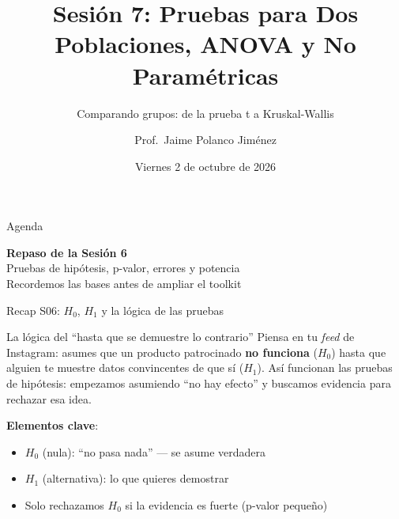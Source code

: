 \documentclass[aspectratio=169, 11pt]{beamer}
\title{Sesión 7: Pruebas para Dos Poblaciones, ANOVA y No Paramétricas}
\subtitle{Comparando grupos: de la prueba t a Kruskal-Wallis}
\author{Prof.\ Jaime Polanco Jim\'enez}
\date{Viernes 2 de octubre de 2026}
\begin{document}
\begin{frame}
\titlepage
\end{frame}

\begin{frame}{Agenda}
\tableofcontents
\end{frame}

\begin{frame}{}
\vfill
\centering
{\Large\textbf{Repaso de la Sesi\'on 6}}\\[1em]
{\normalsize Pruebas de hip\'otesis, p-valor, errores y potencia}\\[0.5em]
{\small Recordemos las bases antes de ampliar el toolkit}
\vfill
\end{frame}

\begin{frame}{Recap S06: $H_0$, $H_1$ y la l\'ogica de las pruebas}
\small
\begin{exampleblock}{La l\'ogica del ``hasta que se demuestre lo contrario''}
Piensa en tu \textit{feed} de Instagram: asumes que un producto patrocinado \textbf{no funciona} ($H_0$) hasta que alguien te muestre datos convincentes de que s\'i ($H_1$). As\'i funcionan las pruebas de hip\'otesis: empezamos asumiendo ``no hay efecto'' y buscamos evidencia para rechazar esa idea.
\end{exampleblock}

\vspace{0.2cm}
\textbf{Elementos clave}:
\begin{itemize}\setlength{\itemsep}{1pt}
  \item $H_0$ (nula): ``no pasa nada'' --- se asume verdadera
  \item $H_1$ (alternativa): lo que quieres demostrar
  \item Solo rechazamos $H_0$ si la evidencia es \alert{fuerte} (p-valor peque\~no)
\end{itemize}
\end{frame}
\end{document}
